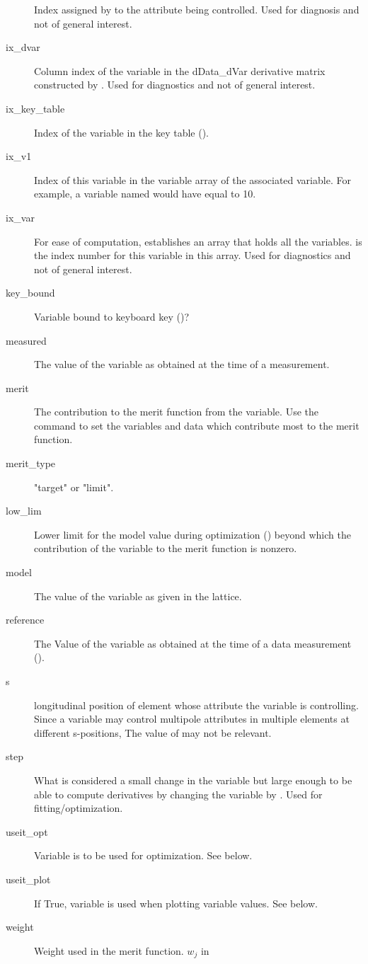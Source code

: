 \begin{description}
Index assigned by \bmad to the attribute being controlled. Used for diagnosis and not
of general interest.
  \item[ix_dvar] \Newline
Column index of the variable in the dData_dVar derivative matrix constructed by \tao.
Used for diagnostics and not of general interest.
  \item[ix_key_table] \Newline
Index of the variable in the key table ().
  \item[ix_v1] \Newline
Index of this variable in the variable array of the associated  variable.
For example, a variable named  would have  equal to 10.
  \item[ix_var] \Newline
For ease of computation, \tao establishes an array that holds all the variables.
 is the index number for this variable in this array. 
Used for diagnostics and not of general interest.
  \item[key_bound] \Newline
Variable bound to keyboard key ()?
  \item[measured] \Newline
The value of the variable as obtained at the time of a  measurement.
  \item[merit] \Newline
The contribution to the merit function  from the variable. Use the 
command to set the variables and data which contribute most to the merit function.
  \item[merit_type] \Newline
"target" or "limit".
  \item[low_lim] \Newline
Lower limit for the model value during optimization () beyond which
the contribution of the variable to the merit function is nonzero.
  \item[model] \Newline
The value of the variable as given in the  lattice.
  \item[reference] \Newline
The Value of the variable as obtained at the time of a  data measurement
().
  \item[s] \Newline
longitudinal position of element whose attribute the variable is controlling.  Since a
variable may control multipole attributes in multiple elements at different s-positions,
The value of  may not be relevant.
  \item[step] \Newline
What is considered a small change in the variable but large enough to be able to compute
derivatives by changing the variable by . Used for fitting/optimization.  
  \item[useit_opt] \Newline
Variable is to be used for optimization. See below.
  \item[useit_plot] \Newline
If True, variable is used when plotting variable values. See below.
  \item[weight] \Newline
Weight used in the merit function. $w_j$ in 
  \end{description}

